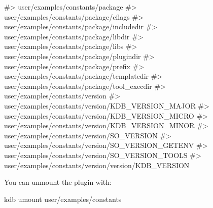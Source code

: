 \begin{DoxyCode}
#> user/examples/constants/package
#> user/examples/constants/package/cflags
#> user/examples/constants/package/includedir
#> user/examples/constants/package/libdir
#> user/examples/constants/package/libs
#> user/examples/constants/package/plugindir
#> user/examples/constants/package/prefix
#> user/examples/constants/package/templatedir
#> user/examples/constants/package/tool\_execdir
#> user/examples/constants/version
#> user/examples/constants/version/KDB\_VERSION\_MAJOR
#> user/examples/constants/version/KDB\_VERSION\_MICRO
#> user/examples/constants/version/KDB\_VERSION\_MINOR
#> user/examples/constants/version/SO\_VERSION
#> user/examples/constants/version/SO\_VERSION\_GETENV
#> user/examples/constants/version/SO\_VERSION\_TOOLS
#> user/examples/constants/version/version/KDB\_VERSION
\end{DoxyCode}


You can unmount the plugin with\+:


\begin{DoxyCode}
kdb umount user/examples/constants
\end{DoxyCode}
 